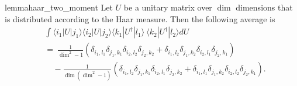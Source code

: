 \documentclass{article}
\newcommand{\ket}[1]{|#1\rangle}
\newcommand{\bra}[1]{\langle #1|}
\newcommand{\parens}[1]{\left( #1 \right)}
\begin{document}
\begin{restatable}{lemma}{haar_two_moment} \label{lem:haar_two_moment}
    Let $U$ be a unitary matrix over $\dim$ dimensions that is distributed according to the Haar measure. Then the following average is
    \begin{align}
        &\int \bra{i_1} U \ket{j_1} \bra{i_2} U \ket{j_2} \bra{k_1} U^\dagger \ket{l_1} ~ \bra{k_2} U^\dagger \ket{l_2} dU \nonumber \\
        &= ~\frac{1}{\dim^2 - 1} \parens{\delta_{i_1, l_1} \delta_{j_1, k_1} \delta_{i_2, l_2} \delta_{j_2, k_2} + \delta_{i_1, l_2} \delta_{j_1, k_2} \delta_{i_2, l_1} \delta_{j_2, k_1}} \nonumber \\
        &\quad - \frac{1}{\dim(\dim^2 - 1)} \parens{\delta_{i_1, l_2} \delta_{j_1, k_1} \delta_{i_2, l_1} \delta_{j_2, k_2} + \delta_{i_1, l_1} \delta_{j_1, k_2} \delta_{i_2, l_2} \delta_{j_2, k_1}}. \label{eq:haar_two_moment_integral}
    \end{align}
\end{restatable}
\end{document}
